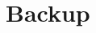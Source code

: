 \documentclass[aspectratio=169]{beamer}
\begin{document}
	
	\appendix
	
	
%	
	
	

	
		\printbibliography
	 
	
	

\newpage
	\section*{Backup}
\end{document}
